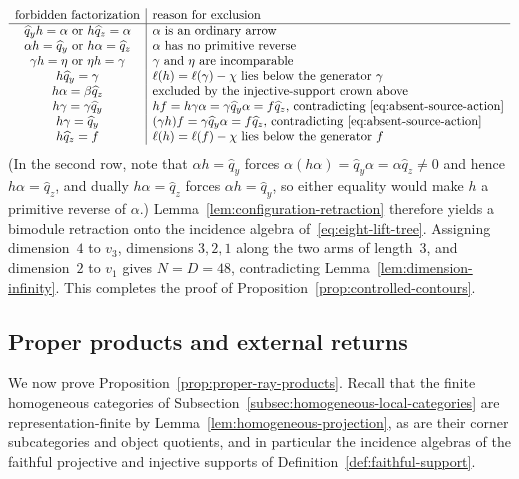 \[
  \begin{array}{c|l}
  \text{forbidden factorization}&\text{reason for exclusion}\\ \hline
  \widehat q_yh=\alpha\text{ or }h\widehat q_z=\alpha&\alpha\text{ is an ordinary arrow}\\
  \alpha h=\widehat q_y\text{ or }h\alpha=\widehat q_z&\alpha\text{ has no primitive reverse}\\
  \gamma h=\eta\text{ or }\eta h=\gamma&\gamma\text{ and }\eta\text{ are incomparable}\\
  h\widehat q_y=\gamma&\ell(h)=\ell(\gamma)-\chi\text{ lies below the generator }\gamma\\
  h\alpha=\beta\widehat q_z&\text{excluded by the injective-support crown above}\\
  h\gamma=\gamma\widehat q_y&hf=h\gamma\alpha=\gamma\widehat q_y\alpha=f\widehat q_z\text{, contradicting~\eqref{eq:absent-source-action}}\\
  h\gamma=\widehat q_y&(\gamma h)f=\gamma\widehat q_y\alpha=f\widehat q_z\text{, contradicting~\eqref{eq:absent-source-action}}\\
  h\widehat q_z=f&\ell(h)=\ell(f)-\chi\text{ lies below the generator }f
  \end{array}
\]
(In the second row, note that $\alpha h=\widehat q_y$ forces $\alpha(h\alpha)=\widehat q_y\alpha=\alpha\widehat q_z\ne0$ and hence $h\alpha=\widehat q_z$, and dually $h\alpha=\widehat q_z$ forces $\alpha h=\widehat q_y$, so either equality would make $h$ a primitive reverse of $\alpha$.) Lemma~\ref{lem:configuration-retraction} therefore yields a bimodule retraction onto the incidence algebra of~\eqref{eq:eight-lift-tree}. Assigning dimension~$4$ to $v_3$, dimensions $3,2,1$ along the two arms of length~$3$, and dimension~$2$ to $v_1$ gives $N=D=48$, contradicting Lemma~\ref{lem:dimension-infinity}. This completes the proof of Proposition~\ref{prop:controlled-contours}.

\subsection{Proper products and external returns}
\label{app:proper-products}

We now prove Proposition~\ref{prop:proper-ray-products}. Recall that the finite homogeneous categories of Subsection~\ref{subsec:homogeneous-local-categories} are representation-finite by Lemma~\ref{lem:homogeneous-projection}, as are their corner subcategories and object quotients, and in particular the incidence algebras of the faithful projective and injective supports of Definition~\ref{def:faithful-support}.

